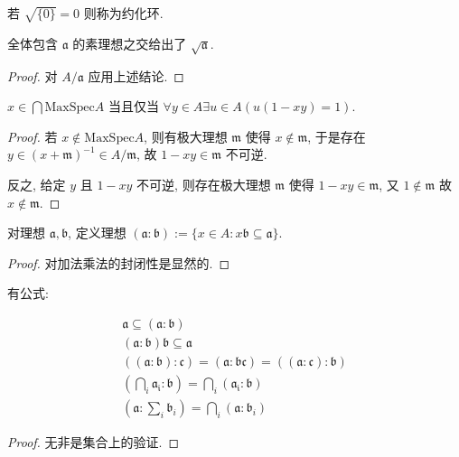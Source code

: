\begin{definition}
    若 \(\sqrt{\{0\}} = 0\) 则称为约化环.
\end{definition}

\begin{corollary}
    全体包含 \(\mathfrak{a}\) 的素理想之交给出了 \(\sqrt{\mathfrak{a}}\).

    \begin{proof}
        对 \(A / \mathfrak{a}\) 应用上述结论.
    \end{proof}
\end{corollary}

\begin{lemma}
    \(x \in \bigcap \mathrm{MaxSpec} A\) 当且仅当 \(\forall y \in A \exists u \in A (u(1-xy) = 1)\).

    \begin{proof}
        若 \(x \notin \mathrm{MaxSpec} A\), 则有极大理想 \(\mathfrak{m}\) 使得 \(x \notin \mathfrak{m}\),
        于是存在 \(y \in {(x + \mathfrak{m})}^{-1} \in A / \mathfrak{m}\), 故 \(1 - xy \in \mathfrak{m}\) 不可逆.

        反之, 给定 \(y\) 且 \(1 - xy\) 不可逆, 则存在极大理想 \(\mathfrak{m}\) 使得 \(1 - xy \in \mathfrak{m}\),
        又 \(1 \notin \mathfrak{m}\) 故 \(x \notin \mathfrak{m}\).
    \end{proof}
\end{lemma}

\begin{definition}[理想除法]
    对理想 \(\mathfrak{a},\mathfrak{b}\), 定义理想 \((\mathfrak{a} : \mathfrak{b}) := \{x \in A : x \mathfrak{b} \subseteq \mathfrak{a}\}\).

    \begin{proof}
        对加法乘法的封闭性是显然的.
    \end{proof}
\end{definition}

\begin{lemma}
    有公式:

    \[
        \begin{aligned}
            \mathfrak{a} \subseteq (\mathfrak{a} : \mathfrak{b}) \\
            (\mathfrak{a} : \mathfrak{b}) \mathfrak{b} \subseteq \mathfrak{a} \\
            ((\mathfrak{a} : \mathfrak{b}) : \mathfrak{c}) = (\mathfrak{a} : \mathfrak{b} \mathfrak{c}) = ((\mathfrak{a} : \mathfrak{c}) : \mathfrak{b}) \\
            (\bigcap_i \mathfrak{a_i} : \mathfrak{b}) = \bigcap_i (\mathfrak{a_i} : \mathfrak{b}) \\
            (\mathfrak{a} : \sum_i \mathfrak{b}_i) = \bigcap_i (\mathfrak{a} : \mathfrak{b}_i)
        \end{aligned}
    \]

    \begin{proof}
        无非是集合上的验证.
    \end{proof}
\end{lemma}

